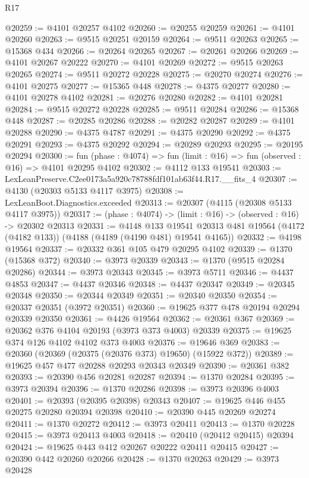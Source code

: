\begin{lexlean}{R17}
\begin{coremodule}
@20259 := @4101 @20257 @4102
@20260 := @20255 @20259
@20261 := @4101 @20260
@20263 := @9515 @20251 @20159
@20264 := @9511 @20263
@20265 := @15368 @434
@20266 := @20264 @20265
@20267 := @20261 @20266
@20269 := @4101 @20267 @20222
@20270 := @4101 @20269
@20272 := @9515 @20263 @20265
@20274 := @9511 @20272 @20228
@20275 := @20270 @20274
@20276 := @4101 @20275
@20277 := @15365 @448
@20278 := @4375 @20277
@20280 := @4101 @20278 @4102
@20281 := @20276 @20280
@20282 := @4101 @20281
@20284 := @9515 @20272 @20228
@20285 := @9511 @20284
@20286 := @15368 @448
@20287 := @20285 @20286
@20288 := @20282 @20287
@20289 := @4101 @20288
@20290 := @4375 @4787
@20291 := @4375 @20290
@20292 := @4375 @20291
@20293 := @4375 @20292
@20294 := @20289 @20293
@20295 := @20195 @20294
@20300 := fun (phase : @4074) => fun (limit : @16) => fun (observed : @16) => @4101 @20295 @4102
@20302 := @4112 @133 @19541
@20303 := LexLeanPreserve.C2ee0173a5a920c78788fdf101ab63f44.R17.__fits_4
@20307 := @4130 (@20303 @5133 @4117 @3975)
@20308 := LexLeanBoot.Diagnostics.exceeded
@20313 := @20307 (@4115 (@20308 @5133 @4117 @3975))
@20317 := (phase : @4074) -> (limit : @16) -> (observed : @16) -> @20302 @20313
@20331 := @4148
    @133
    @19541
    @20313
    @481
    @19564
    (@4172 (@4182 @133))
    (@4188 (@4189 (@4190 @481) @19541 @4165))
@20332 := @4198 @19564
@20337 := @20332 @361 @105 @479 @20295 @4102
@20339 := @1370 (@15368 @372)
@20340 := @3973 @20339
@20343 := @1370 (@9515 @20284 @20286)
@20344 := @3973 @20343
@20345 := @3973 @5711
@20346 := @4437 @4853
@20347 := @4437 @20346
@20348 := @4437 @20347
@20349 := @20345 @20348
@20350 := @20344 @20349
@20351 := @20340 @20350
@20354 := @20337 @20351 (@3972 @20351)
@20360 := @19625 @377 @478 @20194 @20294 @20339 @20350
@20361 := @4426 @19564
@20362 := @20361 @367
@20369 := @20362 @376 @4104 @20193 (@3973 @373 @4003) @20339
@20375 := @19625 @374 @126 @4102 @4102 @373 @4003
@20376 := @19646 @369
@20383 := @20360 (@20369 (@20375 (@20376 @373) @19650) (@15922 @372))
@20389 := @19625 @457 @477 @20288 @20293 @20343 @20349
@20390 := @20361 @382
@20393 := @20390 @456 @20281 @20287
@20394 := @1370 @20284
@20395 := @3973 @20394
@20396 := @1370 @20286
@20398 := @3973 @20396 @4003
@20401 := @20393 (@20395 @20398) @20343
@20407 := @19625 @446 @455 @20275 @20280 @20394 @20398
@20410 := @20390 @445 @20269 @20274
@20411 := @1370 @20272
@20412 := @3973 @20411
@20413 := @1370 @20228
@20415 := @3973 @20413 @4003
@20418 := @20410 (@20412 @20415) @20394
@20424 := @19625 @443 @412 @20267 @20222 @20411 @20415
@20427 := @20390 @442 @20260 @20266
@20428 := @1370 @20263
@20429 := @3973 @20428

\end{coremodule}
\end{lexlean}
